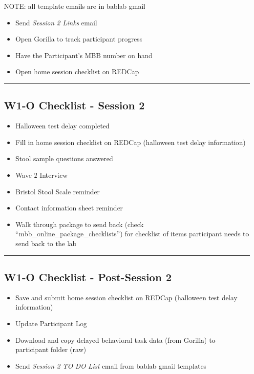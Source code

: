 \documentclass[]{book}
\providecommand{\tightlist}{%
  \setlength{\itemsep}{0pt}\setlength{\parskip}{0pt}}
\begin{document}
NOTE: all template emails are in bablab gmail

\begin{itemize}
\tightlist
\item
  Send \emph{Session 2 Links} email
\item
  Open Gorilla to track participant progress
\item
  Have the Participant's MBB number on hand
\item
  Open home session checklist on REDCap
\end{itemize}

\begin{center}\rule{0.5\linewidth}{0.5pt}\end{center}

\hypertarget{w1-o-checklist---session-2}{%
\subsection{W1-O Checklist - Session 2}\label{w1-o-checklist---session-2}}

\begin{itemize}
\tightlist
\item
  Halloween test delay completed
\item
  Fill in home session checklist on REDCap (halloween test delay information)
\item
  Stool sample questions answered
\item
  Wave 2 Interview
\item
  Bristol Stool Scale reminder
\item
  Contact information sheet reminder
\item
  Walk through package to send back (check ``mbb\_online\_package\_checklists'') for checklist of items participant needs to send back to the lab
\end{itemize}

\begin{center}\rule{0.5\linewidth}{0.5pt}\end{center}

\hypertarget{w1-o-checklist---post-session-2}{%
\subsection{W1-O Checklist - Post-Session 2}\label{w1-o-checklist---post-session-2}}

\begin{itemize}
\tightlist
\item
  Save and submit home session checklist on REDCap (halloween test delay information)
\item
  Update Participant Log
\item
  Download and copy delayed behavioral task data (from Gorilla) to participant folder (raw)
\item
  Send \emph{Session 2 TO DO List} email from bablab gmail templates
\end{itemize}
\end{document}
